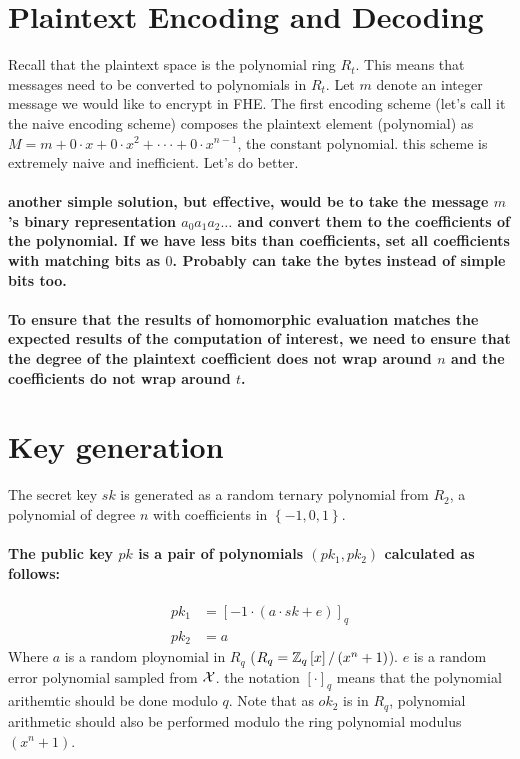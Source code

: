 \section{Plaintext Encoding and Decoding}

Recall that the plaintext space is the polynomial ring $R_{t}$. This
means that messages need to be converted to polynomials in $R_{t}$.
Let $m$ denote an integer message we would like to encrypt in FHE.
The first encoding scheme (let\textquoteright s call it the naive
encoding scheme) composes the plaintext element (polynomial) as $M=m+0\cdot x+0\cdot x^{2}+\cdot\cdot\cdot+0\cdot x^{n-1}$,
the constant polynomial. this scheme is extremely naive and inefficient.
Let's do better.

\paragraph{another simple solution, but effective, would be to take the message
$m$'s binary representation $a_{0}a_{1}a_{2}\dots$ and convert them
to the coefficients of the polynomial. If we have less bits than coefficients,
set all coefficients with matching bits as $0$. Probably can take
the bytes instead of simple bits too. }

\paragraph{To ensure that the results of homomorphic evaluation matches the
expected results of the computation of interest, we need to ensure
that the degree of the plaintext coefficient does not wrap around
$n$ and the coefficients do not wrap around $t$.}

\section{Key generation}

The secret key $sk$ is generated as a random ternary polynomial from
$R_{2}$, a polynomial of degree $n$ with coefficients in $\left\{ -1,0,1\right\} $.

\paragraph{The public key $pk$ is a pair of polynomials $\left(pk_{1},pk_{2}\right)$
calculated as follows: }

\begin{align*}
pk_{1} & =\left[-1\cdot\left(a\cdot sk+e\right)\right]_{q}\\
pk_{2} & =a
\end{align*}
 Where $a$ is a random ploynomial in $R_{q}$ ($R_{q}=\mathbb{Z}_{q}\left[x\right]/\left(x^{n}+1\right)$).
$e$ is a random error polynomial sampled from $\mathcal{X}$. the notation
$\left[\cdot\right]_{q}$ means that the polynomial arithemtic should
be done modulo $q$. Note that as $ok_{2}$ is in $R_{q}$, polynomial
arithmetic should also be performed modulo the ring polynomial modulus
$\left(x^{n}+1\right)$.

